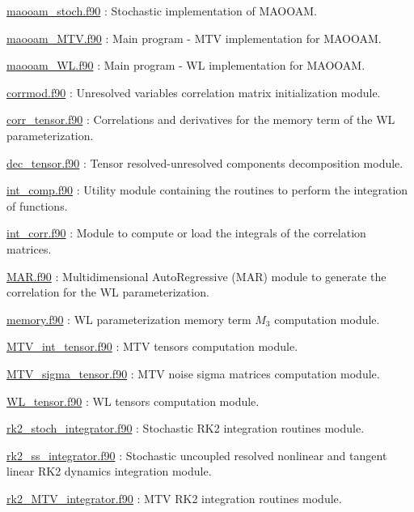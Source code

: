 \begin{DoxyItemize}
\item \hyperlink{maooam__stoch_8f90}{maooam\+\_\+stoch.\+f90} \+: Stochastic implementation of M\+A\+O\+O\+AM.
\item \hyperlink{maooam__MTV_8f90}{maooam\+\_\+\+M\+T\+V.\+f90} \+: Main program -\/ M\+TV implementation for M\+A\+O\+O\+AM.
\item \hyperlink{maooam__WL_8f90}{maooam\+\_\+\+W\+L.\+f90} \+: Main program -\/ WL implementation for M\+A\+O\+O\+AM.
\item \hyperlink{corrmod_8f90}{corrmod.\+f90} \+: Unresolved variables correlation matrix initialization module.
\item \hyperlink{corr__tensor_8f90}{corr\+\_\+tensor.\+f90} \+: Correlations and derivatives for the memory term of the WL parameterization.
\item \hyperlink{dec__tensor_8f90}{dec\+\_\+tensor.\+f90} \+: Tensor resolved-\/unresolved components decomposition module.
\item \hyperlink{int__comp_8f90}{int\+\_\+comp.\+f90} \+: Utility module containing the routines to perform the integration of functions.
\item \hyperlink{int__corr_8f90}{int\+\_\+corr.\+f90} \+: Module to compute or load the integrals of the correlation matrices.
\item \hyperlink{MAR_8f90}{M\+A\+R.\+f90} \+: Multidimensional Auto\+Regressive (M\+AR) module to generate the correlation for the WL parameterization.
\item \hyperlink{memory_8f90}{memory.\+f90} \+: WL parameterization memory term $M_3$ computation module.
\item \hyperlink{MTV__int__tensor_8f90}{M\+T\+V\+\_\+int\+\_\+tensor.\+f90} \+: M\+TV tensors computation module.
\item \hyperlink{MTV__sigma__tensor_8f90}{M\+T\+V\+\_\+sigma\+\_\+tensor.\+f90} \+: M\+TV noise sigma matrices computation module.
\item \hyperlink{WL__tensor_8f90}{W\+L\+\_\+tensor.\+f90} \+: WL tensors computation module.
\item \hyperlink{rk2__stoch__integrator_8f90}{rk2\+\_\+stoch\+\_\+integrator.\+f90} \+: Stochastic R\+K2 integration routines module.
\item \hyperlink{rk2__ss__integrator_8f90}{rk2\+\_\+ss\+\_\+integrator.\+f90} \+: Stochastic uncoupled resolved nonlinear and tangent linear R\+K2 dynamics integration module.
\item \hyperlink{rk2__MTV__integrator_8f90}{rk2\+\_\+\+M\+T\+V\+\_\+integrator.\+f90} \+: M\+TV R\+K2 integration routines module.

\end{DoxyItemize}
